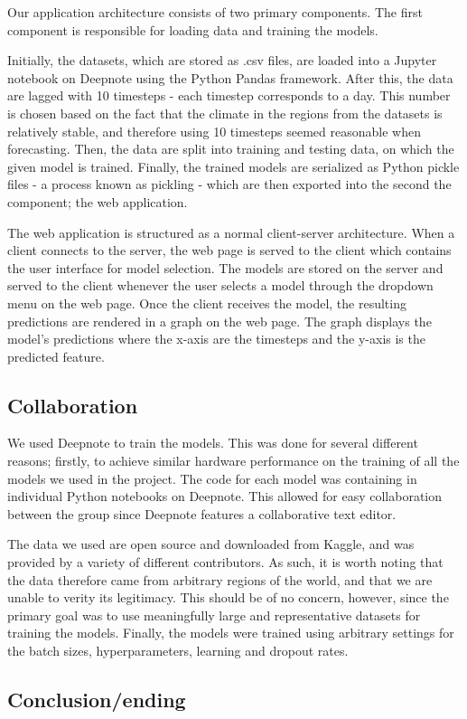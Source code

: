 Our application architecture consists of two primary components.
The first component is responsible for loading data and training the models.

Initially, the datasets, which are stored as .csv files, are loaded into a Jupyter notebook on Deepnote using the Python Pandas framework.
After this, the data are lagged with 10 timesteps - each timestep corresponds to a day.
This number is chosen based on the fact that the climate in the regions from the datasets is relatively stable, and therefore using 10 timesteps seemed reasonable when forecasting.
Then, the data are split into training and testing data, on which the given model is trained. 
Finally, the trained models are serialized as Python pickle files - a process known as pickling - which are then exported into the second the component; the web application.

The web application is structured as a normal client-server architecture.
When a client connects to the server, the web page is served to the client which contains the user interface for model selection.
The models are stored on the server and served to the client whenever the user selects a model through the dropdown menu on the web page.
Once the client receives the model, the resulting predictions are rendered in a graph on the web page.
The graph displays the model's predictions where the x-axis are the timesteps and the y-axis is the predicted feature.


\subsection{Collaboration}
We used Deepnote\cite{deepnote} to train the models. 
This was done for several different reasons; firstly, to achieve similar hardware performance on the training of all the models we used in the project.
The code for each model was containing in individual Python notebooks on Deepnote.
This allowed for easy collaboration between the group since Deepnote features a collaborative text editor.

The data we used are open source and downloaded from Kaggle\cite{kaggle}, and was provided by a variety of different contributors.
As such, it is worth noting that the data therefore came from arbitrary regions of the world, and that we are unable to verity its legitimacy.
This should be of no concern, however, since the primary goal was to use meaningfully large and representative datasets for training the models.
Finally, the models were trained using arbitrary settings for the batch sizes, hyperparameters, learning and dropout rates.


\subsection{Conclusion/ending}
